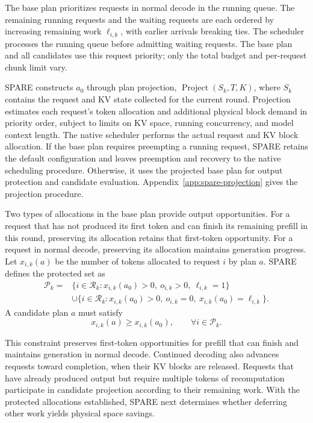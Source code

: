 \documentclass[sigconf,anonymous,review]{acmart}
\begin{document}
The base plan prioritizes requests in normal decode in the running queue. The remaining running requests and the waiting requests are each ordered by increasing remaining work $\ell_{i,k}$, with earlier arrivals breaking ties. The scheduler processes the running queue before admitting waiting requests. The base plan and all candidates use this request priority; only the total budget and per-request chunk limit vary.

SPARE constructs $a_0$ through plan projection, $\operatorname{Project}(S_k,T,K)$, where $S_k$ contains the request and KV state collected for the current round. Projection estimates each request's token allocation and additional physical block demand in priority order, subject to limits on KV space, running concurrency, and model context length. The native scheduler performs the actual request and KV block allocation. If the base plan requires preempting a running request, SPARE retains the default configuration and leaves preemption and recovery to the native scheduling procedure. Otherwise, it uses the projected base plan for output protection and candidate evaluation. Appendix~\ref{app:spare-projection} gives the projection procedure.

Two types of allocations in the base plan provide output opportunities. For a request that has not produced its first token and can finish its remaining prefill in this round, preserving its allocation retains that first-token opportunity. For a request in normal decode, preserving its allocation maintains generation progress. Let $x_{i,k}(a)$ be the number of tokens allocated to request $i$ by plan $a$. SPARE defines the protected set as
\begin{equation}
\begin{aligned}
\mathcal P_k={}&\{i\in\mathcal R_k:x_{i,k}(a_0)>0,
\ o_{i,k}>0,\ \ell_{i,k}=1\}\\
&\cup\{i\in\mathcal R_k:x_{i,k}(a_0)>0,
\ o_{i,k}=0,\ x_{i,k}(a_0)=\ell_{i,k}\}.
\end{aligned}
\tag{5}\label{eq:spare-protected-set}
\end{equation}
A candidate plan $a$ must satisfy
\begin{equation}
x_{i,k}(a)\ge x_{i,k}(a_0),
\qquad \forall i\in\mathcal P_k.
\tag{6}\label{eq:spare-protection}
\end{equation}

This constraint preserves first-token opportunities for prefill that can finish and maintains generation in normal decode. Continued decoding also advances requests toward completion, when their KV blocks are released. Requests that have already produced output but require multiple tokens of recomputation participate in candidate projection according to their remaining work. With the protected allocations established, SPARE next determines whether deferring other work yields physical space savings.
\end{document}
